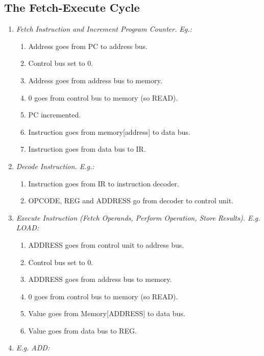 \documentclass[twocolumn,english]{article}
\begin{document}
\subsection{The Fetch-Execute Cycle}
\begin{enumerate}
\item \emph{Fetch Instruction and Increment Program Counter. Eg.:}

\begin{enumerate}
\item Address goes from PC to address bus.
\item Control bus set to 0.
\item Address goes from address bus to memory.
\item 0 goes from control bus to memory (so READ).
\item PC incremented.
\item Instruction goes from memory{[}address{]} to data bus.
\item Instruction goes from data bus to IR.
\end{enumerate}
\item \emph{Decode Instruction. E.g.:}

\begin{enumerate}
\item Instruction goes from IR to instruction decoder.
\item OPCODE, REG and ADDRESS go from decoder to control unit.
\end{enumerate}
\item \emph{Execute Instruction (Fetch Operands, Perform Operation, Store
Results). E.g. LOAD:}

\begin{enumerate}
\item ADDRESS goes from control unit to address bus.
\item Control bus set to 0.
\item ADDRESS goes from address bus to memory.
\item 0 goes from control bus to memory (so READ).
\item Value goes from Memory{[}ADDRESS{]} to data bus.
\item Value goes from data bus to REG.
\end{enumerate}
\item \emph{E.g. ADD:}


\end{enumerate}
\end{document}
